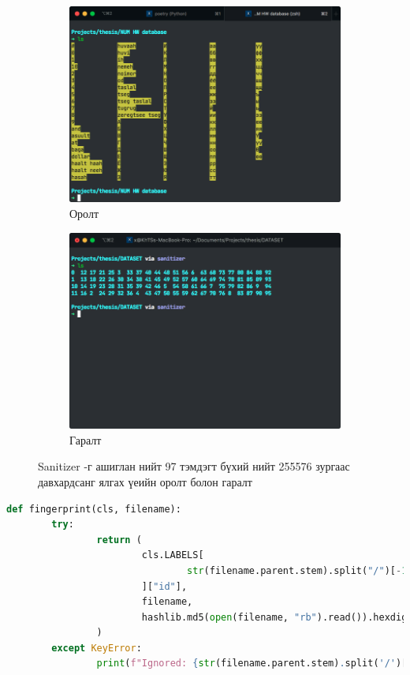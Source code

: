 \begin{figure}[ht]
	\begin{subfigure}{0.5\textwidth}
		\centering
		\includegraphics[width=0.9\linewidth]{images/sanitizer_input}
		\caption{Оролт}
		\label{fig:sanitizer_input}
	\end{subfigure}
	\begin{subfigure}{0.5\textwidth}
		\centering
		\includegraphics[width=0.9\linewidth]{images/sanitizer_output}
		\caption{Гаралт}
		\label{fig:sanitizer_output}
	\end{subfigure}
	\caption{Sanitizer -г ашиглан нийт 97 тэмдэгт бүхий нийт 255576 зургаас давхардсанг ялгах үеийн оролт болон гаралт}
	\label{fig:sanitizer}
\end{figure}

\begin{lstlisting}[caption={Параметраар өгөгдсөн файлын нэрээр зургийг уншин тэмдэгтийн түлхүүр (label), зургийн нэр, hash утгыг агуулсан tuple буцаах функц}, label={lst:collect_hash}, language=Python]
def fingerprint(cls, filename):
		try:
				return (
						cls.LABELS[
								str(filename.parent.stem).split("/")[-1]
						]["id"],
						filename,
						hashlib.md5(open(filename, "rb").read()).hexdigest(),
				)
		except KeyError:
				print(f"Ignored: {str(filename.parent.stem).split('/')[-1]}")

\end{lstlisting}

